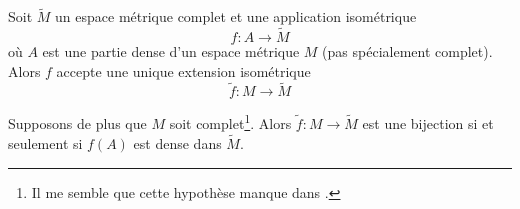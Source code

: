 \begin{theorem}\label{ThoPHllyoB}
	Soit \( \tilde M\) un espace métrique complet et une application isométrique
	\begin{equation}
		f\colon A\to \tilde M
	\end{equation}
	où \( A\) est une partie dense d'un espace métrique \( M\) (pas spécialement complet). Alors \( f\) accepte une unique extension isométrique
	\begin{equation}
		\tilde f\colon M\to \tilde M
	\end{equation}

	Supposons de plus que \( M\) soit complet\footnote{Il me semble que cette hypothèse manque dans \cite{JBRzHwn}.}. Alors \( \tilde f\colon M\to\tilde M\) est une bijection si et seulement si \( f(A)\) est dense dans \( \tilde M\).
\end{theorem}

